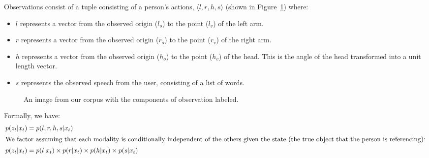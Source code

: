 \documentclass[a4paper, 11pt]{article} %
\begin{document}
Observations consist of a tuple consisting of a person's actions,
$\langle l, r, h, s\rangle $ (shown in Figure~\ref{fig:labeled_obs}) where:
\begin{itemize}
    \item $l$ represents a vector from the observed origin ($l_o$) to the point ($l_v$) of the left arm.
    \item $r$ represents a vector from the observed origin ($r_o$) to the point ($r_v$) of the right arm.
    \item $h$ represents a vector from the observed origin ($h_o$) to the point ($h_v$) of the head. This is the angle of the head transformed into a unit length vector.
    \item $s$ represents the observed speech from the user,
          consisting of a list of words.
    \end{itemize}

\begin{figure}[h]
\centering
{}
\caption{An image from our corpus with the components of observation labeled.\label{fig:labeled_obs}}
\end{figure}
Formally, we have:
\begin{align}
p(z_t | x_t) &= p(l, r, h, s | x_t)\\
\intertext{We factor assuming that each modality is conditionally independent of the others given the state (the true object that the person is referencing):}
p(z_t | x_t) &= p(l | x_t) \times p(r | x_t) \times p(h | x_t) \times p(s | x_t)
\end{align}
\end{document}
